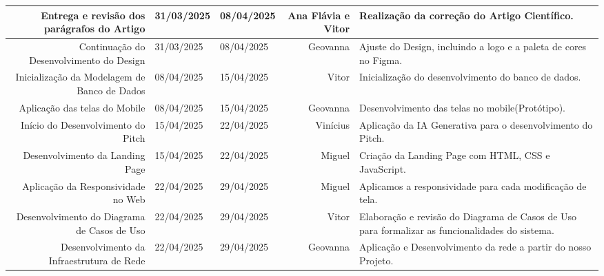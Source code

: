 \documentclass[
    landscape, %
    a4paper,
    12pt,
    brazilian,
]{article}
\newlength{\colAtividadeF}
\newlength{\colDataF}
\newlength{\colResponsavelF}
\begin{document}
\begin{center} 
\renewcommand{\arraystretch}{1.2} %

\begin{tabularx}{\textwidth}{|N{\colAtividadeF}|M{\colDataF}|M{\colDataF}|N{\colResponsavelF}|>{\raggedright\arraybackslash}X|}
\hline
Entrega e revisão dos parágrafos do Artigo & 31/03/2025 & 08/04/2025 & Ana Flávia e Vitor & Realização da correção do Artigo Científico.\\ \hline
Continuação do Desenvolvimento do Design& 31/03/2025 & 08/04/2025 & Geovanna& Ajuste do Design, incluindo a logo e a paleta de cores no Figma.\\ \hline
Inicialização da Modelagem de Banco de Dados & 08/04/2025 & 15/04/2025 & Vitor & Inicialização do desenvolvimento do banco de dados.\\ \hline
Aplicação das telas do Mobile & 08/04/2025 & 15/04/2025 & Geovanna & Desenvolvimento das telas no mobile(Protótipo).\\ \hline
Início do Desenvolvimento do Pitch & 15/04/2025 & 22/04/2025 & Vinícius & Aplicação da IA Generativa para o desenvolvimento do Pitch.\\ \hline
Desenvolvimento da Landing Page& 15/04/2025 & 22/04/2025 & Miguel & Criação da Landing Page com HTML, CSS e JavaScript.\\ \hline
Aplicação da Responsividade no Web & 22/04/2025 & 29/04/2025 & Miguel & Aplicamos a responsividade para cada modificação de tela.\\ \hline
Desenvolvimento do Diagrama de Casos de Uso & 22/04/2025 & 29/04/2025 & Vitor & Elaboração e revisão do Diagrama de Casos de Uso para formalizar as funcionalidades do sistema.\\ \hline
Desenvolvimento da Infraestrutura de Rede & 22/04/2025 & 29/04/2025 & Geovanna & Aplicação e Desenvolvimento da rede a partir do nosso Projeto.\\ \hline
\end{tabularx}
\end{center} 
\end{document}
